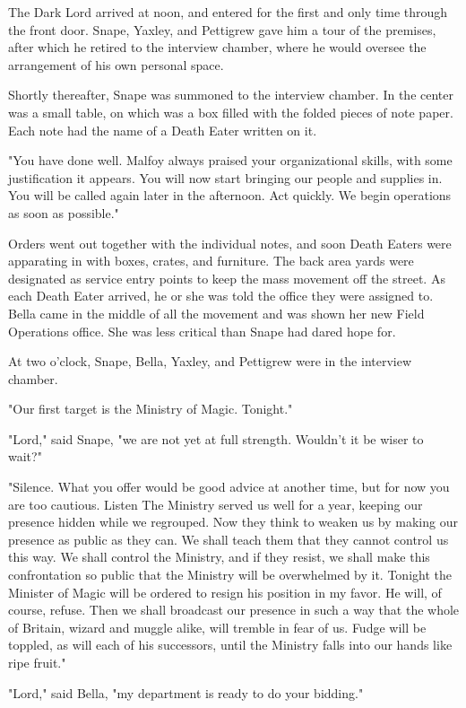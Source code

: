 The Dark Lord arrived at noon, and entered for the first and only time through the front door. Snape, Yaxley, and Pettigrew gave him a tour of the premises, after which he retired to the interview chamber, where he would oversee the arrangement of his own personal space.

Shortly thereafter, Snape was summoned to the interview chamber. In the center was a small table, on which was a box filled with the folded pieces of note paper. Each note had the name of a Death Eater written on it.

"You have done well. Malfoy always praised your organizational skills, with some justification it appears. You will now start bringing our people and supplies in. You will be called again later in the afternoon. Act quickly. We begin operations as soon as possible."

Orders went out together with the individual notes, and soon Death Eaters were apparating in with boxes, crates, and furniture. The back area yards were designated as service entry points to keep the mass movement off the street. As each Death Eater arrived, he or she was told the office they were assigned to. Bella came in the middle of all the movement and was shown her new Field Operations office. She was less critical than Snape had dared hope for.

At two o'clock, Snape, Bella, Yaxley, and Pettigrew were in the interview chamber.

"Our first target is the Ministry of Magic. Tonight."

"Lord," said Snape, "we are not yet at full strength. Wouldn't it be wiser to wait?"

"Silence. What you offer would be good advice at another time, but for now you are too cautious. Listen{\el} The Ministry served us well for a year, keeping our presence hidden while we regrouped. Now they think to weaken us by making our presence as public as they can. We shall teach them that they cannot control us this way. We shall control the Ministry, and if they resist, we shall make this confrontation so public that the Ministry will be overwhelmed by it. Tonight the Minister of Magic will be ordered to resign his position in my favor. He will, of course, refuse. Then we shall broadcast our presence in such a way that the whole of Britain, wizard and muggle alike, will tremble in fear of us. Fudge will be toppled, as will each of his successors, until the Ministry falls into our hands like ripe fruit."

"Lord," said Bella, "my department is ready to do your bidding."

